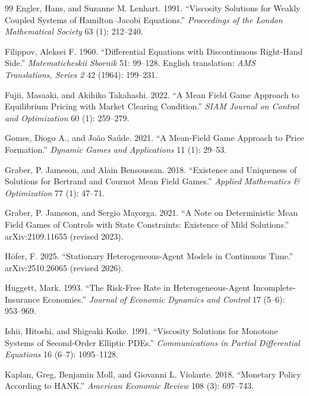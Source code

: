 \documentclass[11pt]{article}
\theoremstyle{definition}
\theoremstyle{remark}
\begin{document}
\begin{thebibliography}{99}
Engler, Hans, and Suzanne M. Lenhart. 1991. ``Viscosity Solutions for
Weakly Coupled Systems of Hamilton--Jacobi Equations.''
\emph{Proceedings of the London Mathematical Society} 63 (1):
212--240.

Filippov, Aleksei F. 1960. ``Differential Equations with
Discontinuous Right-Hand Side.'' \emph{Matematicheskii Sbornik} 51:
99--128. English translation: \emph{AMS Translations, Series 2} 42
(1964): 199--231.

Fujii, Masaaki, and Akihiko Takahashi. 2022. ``A Mean Field Game
Approach to Equilibrium Pricing with Market Clearing Condition.''
\emph{SIAM Journal on Control and Optimization} 60 (1): 259--279.

Gomes, Diogo A., and Jo\~ao Sa\'ude. 2021. ``A Mean-Field Game
Approach to Price Formation.'' \emph{Dynamic Games and Applications}
11 (1): 29--53.

Graber, P. Jameson, and Alain Bensoussan. 2018. ``Existence and
Uniqueness of Solutions for Bertrand and Cournot Mean Field Games.''
\emph{Applied Mathematics \& Optimization} 77 (1): 47--71.

Graber, P. Jameson, and Sergio Mayorga. 2021. ``A Note on
Deterministic Mean Field Games of Controls with State Constraints:
Existence of Mild Solutions.'' arXiv:2109.11655 (revised 2023).

H\"ofer, F. 2025. ``Stationary Heterogeneous-Agent Models in
Continuous Time.'' arXiv:2510.26065 (revised 2026).

Huggett, Mark. 1993. ``The Risk-Free Rate in Heterogeneous-Agent
Incomplete-Insurance Economies.'' \emph{Journal of Economic Dynamics
and Control} 17 (5--6): 953--969.

Ishii, Hitoshi, and Shigeaki Koike. 1991. ``Viscosity Solutions for
Monotone Systems of Second-Order Elliptic PDEs.''
\emph{Communications in Partial Differential Equations} 16 (6--7):
1095--1128.

Kaplan, Greg, Benjamin Moll, and Giovanni L. Violante. 2018.
``Monetary Policy According to HANK.'' \emph{American Economic
Review} 108 (3): 697--743.


\end{thebibliography}
\end{document}
